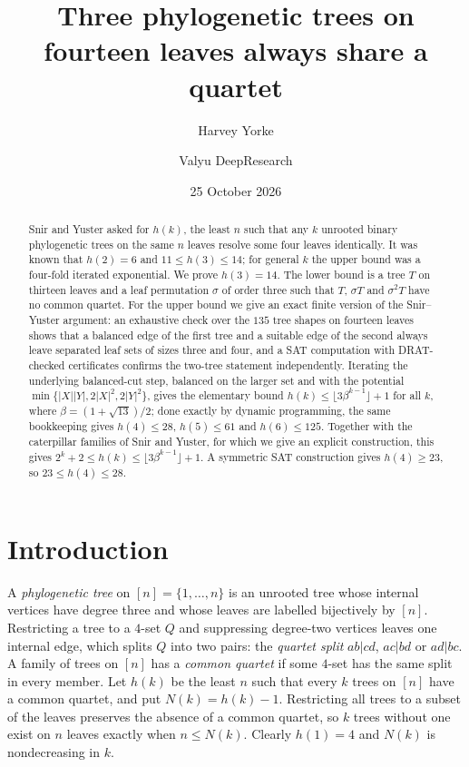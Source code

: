 \documentclass[11pt]{amsart}
\title{Three phylogenetic trees on fourteen leaves always share a quartet}
\author{Harvey Yorke}
\author{Valyu DeepResearch}
\date{25 October 2026}
\theoremstyle{remark}
\begin{document}
\raggedbottom
\begin{abstract}
Snir and Yuster asked for $h(k)$, the least $n$ such that any $k$ unrooted binary phylogenetic trees on the same $n$ leaves resolve some four leaves identically. It was known that $h(2)=6$ and $11\le h(3)\le14$; for general $k$ the upper bound was a four-fold iterated exponential. We prove $h(3)=14$. The lower bound is a tree $T$ on thirteen leaves and a leaf permutation $\sigma$ of order three such that $T$, $\sigma T$ and $\sigma^2T$ have no common quartet. For the upper bound we give an exact finite version of the Snir--Yuster argument: an exhaustive check over the $135$ tree shapes on fourteen leaves shows that a balanced edge of the first tree and a suitable edge of the second always leave separated leaf sets of sizes three and four, and a SAT computation with DRAT-checked certificates confirms the two-tree statement independently. Iterating the underlying balanced-cut step, balanced on the larger set and with the potential $\min\{|X||Y|,2|X|^2,2|Y|^2\}$, gives the elementary bound $h(k)\le\lfloor 3\beta^{k-1}\rfloor+1$ for all $k$, where $\beta=(1+\sqrt{13})/2$; done exactly by dynamic programming, the same bookkeeping gives $h(4)\le28$, $h(5)\le61$ and $h(6)\le125$. Together with the caterpillar families of Snir and Yuster, for which we give an explicit construction, this gives $2^k+2\le h(k)\le\lfloor 3\beta^{k-1}\rfloor+1$. A symmetric SAT construction gives $h(4)\ge23$, so $23\le h(4)\le28$.
\end{abstract}
\maketitle

\section{Introduction}

A \emph{phylogenetic tree} on $[n]=\{1,\dots,n\}$ is an unrooted tree whose internal vertices have degree three and whose leaves are labelled bijectively by $[n]$. Restricting a tree to a $4$-set $Q$ and suppressing degree-two vertices leaves one internal edge, which splits $Q$ into two pairs: the \emph{quartet split} $ab|cd$, $ac|bd$ or $ad|bc$. A family of trees on $[n]$ has a \emph{common quartet} if some $4$-set has the same split in every member. Let $h(k)$ be the least $n$ such that every $k$ trees on $[n]$ have a common quartet, and put $N(k)=h(k)-1$. Restricting all trees to a subset of the leaves preserves the absence of a common quartet, so $k$ trees without one exist on $n$ leaves exactly when $n\le N(k)$. Clearly $h(1)=4$ and $N(k)$ is nondecreasing in $k$.
\end{document}
